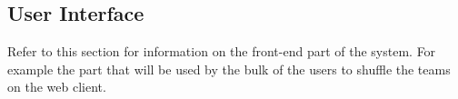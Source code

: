 \subsection{User Interface}
	Refer to this section for information on the front-end part of the system. For example the part that will be used by the bulk of the users to shuffle the teams on the web client.\par
	\vspace{0.3cm}
	